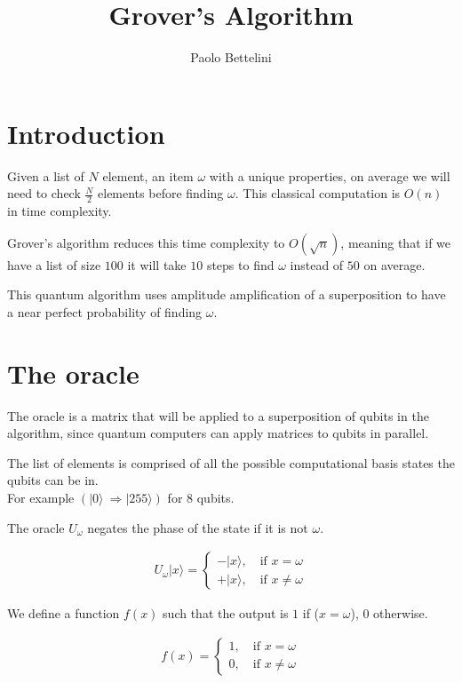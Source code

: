 \documentclass{article}
\title{Grover's Algorithm}
\author{Paolo Bettelini}
\date{}
\begin{document}
\maketitle
\tableofcontents
\pagebreak

\section{Introduction}

Given a list of \(N\) element, an item \(\omega\) with a unique properties, on average we will need to check \(\frac{N}{2}\) elements before finding \(\omega\).
This classical computation is \(O(n)\) in time complexity.

Grover's algorithm reduces this time complexity to \(O(\sqrt{n})\), meaning that if we have a list of size \(100\) it will take \(10\) steps to find \(\omega\) instead of \(50\) on average.

This quantum algorithm uses amplitude amplification of a superposition to have a near perfect probability of finding \(\omega\).

\pagebreak

\section{The oracle}

The oracle is a matrix that will be applied to a superposition of qubits in the algorithm, since quantum computers can apply matrices to qubits in parallel.

The list of elements is comprised of all the possible computational basis states the qubits can be in.\\
For example \((|0\rangle\ \Rightarrow |255\rangle)\) for 8 qubits.

The oracle \(U_\omega\) negates the phase of the state if it is not \(\omega\).

\begin{align*}
    U_\omega|x\rangle=
    \begin{cases}
        -|x\rangle,\quad \text{if } x=\omega \\
        +|x\rangle,\quad \text{if } x\neq\omega
    \end{cases}
\end{align*}

We define a function \(f(x)\) such that the output is \(1\) if (\(x=\omega\)), \(0\) otherwise.

\begin{align*}
    f(x)=
    \begin{cases}
        1,\quad \text{if } x=\omega \\
        0,\quad \text{if } x\neq\omega
    \end{cases}
\end{align*}
\end{document}
